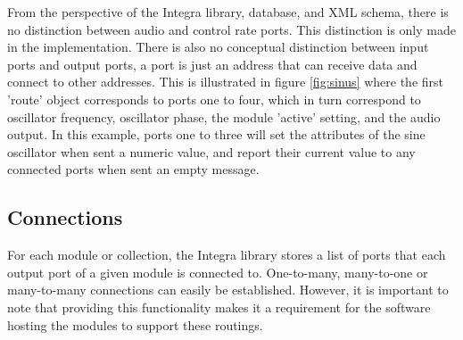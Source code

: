 \documentclass{article}
\begin{document}
From the perspective of the Integra library, database, and XML schema,
there is no distinction between audio and control rate ports. This
distinction is only made in the implementation. There is also no
conceptual distinction between input ports and output ports, a port is
just an address that can receive data and connect to other addresses.
This is illustrated in figure \ref{fig:sinus} where the first 'route'
object corresponds to ports one to four, which in turn correspond to
oscillator frequency, oscillator phase, the module 'active' setting, and
the audio output. In this example, ports one to three will set the
attributes of the sine oscillator when sent a numeric value, and report
their current value to any connected ports when sent an empty message.

\subsection{Connections}\label{subsec:connections}

For each module or collection, the Integra library stores a list of ports that each output port of a given module is connected to. One-to-many, many-to-one or many-to-many connections can easily be established. However, it is important to note that providing this functionality makes it a requirement for the software hosting the modules to support these routings. 
\end{document}
